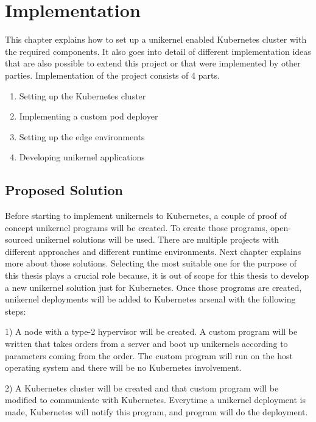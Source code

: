 \chapter{Implementation}\label{chapter:implementation}
This chapter explains how to set up a unikernel enabled Kubernetes cluster with the required components. It also goes into detail of different implementation ideas that are also possible to extend this project or that were implemented by other parties. Implementation of the project consists of 4 parts.
\begin{enumerate}
\item Setting up the Kubernetes cluster
\item Implementing a custom pod deployer
\item Setting up the edge environments
\item Developing unikernel applications
\end{enumerate}








\iffalse
\section{Proposed Solution}

Before starting to implement unikernels to Kubernetes, a couple of proof of concept unikernel programs will be created. To create those programs, open-sourced unikernel solutions will be used. There are multiple projects with different approaches and different runtime environments. Next chapter explains more about those solutions. Selecting the most suitable one for the purpose of this thesis plays a crucial role because, it is out of scope for this thesis to develop a new unikernel solution just for Kubernetes. Once those programs are created, unikernel deployments will be added to Kubernetes arsenal with the following steps:

1) A node with a type-2 hypervisor will be created. A custom program will be written that takes orders from a server and boot up unikernels according to parameters coming from the order. The custom program will run on the host operating system and there will be no Kubernetes involvement.

2) A Kubernetes cluster will be created and that custom program will be modified to communicate with Kubernetes. Everytime a unikernel deployment is made, Kubernetes will notify this program, and program will do the deployment.

